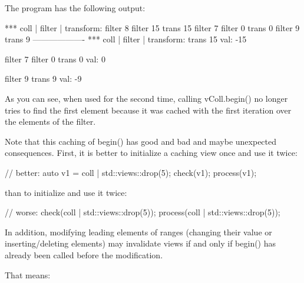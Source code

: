 The program has the following output:

{\footnotesize
\begin{shell}
*** coll | filter | transform:
filter 8
filter 15
trans 15
filter 7
filter 0
trans 0
filter 9
trans 9
-------------------
*** coll | filter | transform:
trans 15
val: -15

filter 7
filter 0
trans 0
val: 0

filter 9
trans 9
val: -9
\end{shell}
}

As you can see, when used for the second time, calling vColl.begin() no longer tries to find the first element because it was cached with the first iteration over the elements of the filter.

Note that this caching of begin() has good and bad and maybe unexpected consequences. First, it is better to initialize a caching view once and use it twice:

\begin{cpp}
// better:
auto v1 = coll | std::views::drop(5);
check(v1);
process(v1);
\end{cpp}

than to initialize and use it twice:

\begin{cpp}
// worse:
check(coll | std::views::drop(5));
process(coll | std::views::drop(5));
\end{cpp}

In addition, modifying leading elements of ranges (changing their value or inserting/deleting elements) may invalidate views if and only if begin() has already been called before the modification.

That means:

